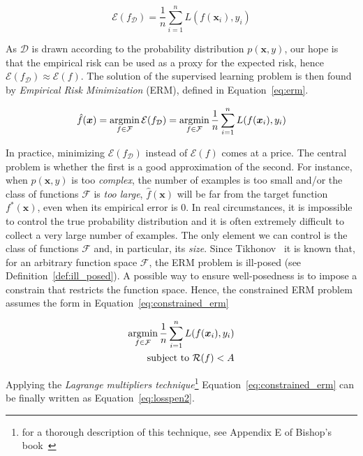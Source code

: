 \begin{equation} \label{eq:empirical_risk}
	\mathcal{E}(f_{\mathcal{D}}) = \frac{1}{n} \sum_{i=1}^{n} L(f(\bm{x}_i), y_i)
\end{equation}

As $\mathcal{D}$ is drawn according to the probability distribution $p(\bm{x},y)$, our hope is that the empirical risk can be used as a proxy for the expected risk, hence $\mathcal{E}(f_{\mathcal{D}}) \approx \mathcal{E}(f)$. The solution of the supervised learning problem is then found by \textit{Empirical Risk Minimization} (ERM), defined in Equation~\eqref{eq:erm}.

\begin{equation} \label{eq:erm}
	\hat f(\bm{x}) = \mathop{\mathrm{argmin}}\limits_{f \in \mathcal{F}}{\mathcal{E}(f_{\mathcal{D}})} = \mathop{\mathrm{argmin}}\limits_{f \in \mathcal{F}}{\frac{1}{n} \sum_{i=1}^{n} L(f(\bm{x}_i), y_i)}
\end{equation}

In practice, minimizing $\mathcal{E}(f_{\mathcal{D}})$ instead of $\mathcal{E}(f)$ comes at a price. The central problem is whether the first is a good approximation of the second. For instance, when $p(\bm{x}, y)$ is too \textit{complex}, the number of examples is too small and/or the class of functions $\mathcal{F}$ is \textit{too large}, $\hat f(\bm{x})$ will be far from the target function $f^*(\bm{x})$, even when its empirical error is $0$. In real circumstances, it is impossible to control the true probability distribution and it is often extremely difficult to collect a very large number of examples. The only element we can control is the class of functions $\mathcal{F}$ and, in particular, its \textit{size}. Since Tikhonov~\cite{tikhonov1963solution} it is known that, for an arbitrary function space $\mathcal{F}$, the ERM problem is ill-posed (see Definition~\ref{def:ill_posed}). A possible way to ensure well-posedness is to impose a constrain that restricts the function space. Hence, the constrained ERM problem assumes the form in Equation~\eqref{eq:constrained_erm}

\begin{equation} \label{eq:constrained_erm}
	\begin{aligned}
		\mathop{\mathrm{argmin}}\limits_{f \in \mathcal{F}}{\frac{1}{n} \sum_{i=1}^{n} L(f(\bm{x}_i), y_i)} \\
		\text{subject to}~\mathcal{R}(f) < A
	\end{aligned}
\end{equation}

Applying the \textit{Lagrange multipliers technique}\footnote{for a thorough description of this technique, see Appendix E of Bishop's book~\cite{bishop2006pattern}} Equation~\eqref{eq:constrained_erm} can be finally written as Equation~\eqref{eq:losspen2}.

